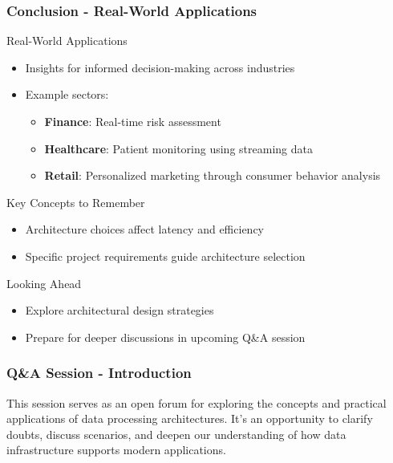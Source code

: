 \documentclass[aspectratio=169]{beamer}
\begin{document}
\begin{frame}[fragile]
    \frametitle{Conclusion - Real-World Applications}
    \begin{block}{Real-World Applications}
        \begin{itemize}
            \item Insights for informed decision-making across industries
            \item Example sectors:
            \begin{itemize}
                \item \textbf{Finance}: Real-time risk assessment
                \item \textbf{Healthcare}: Patient monitoring using streaming data
                \item \textbf{Retail}: Personalized marketing through consumer behavior analysis
            \end{itemize}
        \end{itemize}
    \end{block}

    \begin{block}{Key Concepts to Remember}
        \begin{itemize}
            \item Architecture choices affect latency and efficiency
            \item Specific project requirements guide architecture selection
        \end{itemize}
    \end{block}

    \begin{block}{Looking Ahead}
        \begin{itemize}
            \item Explore architectural design strategies
            \item Prepare for deeper discussions in upcoming Q\&A session
        \end{itemize}
    \end{block}
\end{frame}

\begin{frame}[fragile]
  \frametitle{Q\&A Session - Introduction}
  This session serves as an open forum for exploring the concepts and practical applications of data processing architectures. It's an opportunity to clarify doubts, discuss scenarios, and deepen our understanding of how data infrastructure supports modern applications.
\end{frame}
\end{document}

